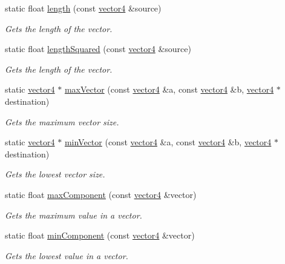 \begin{DoxyCompactItemize}
static float \hyperlink{classflounder_1_1vector4_a0e726e01876f3383d857fa6c4e45c293}{length} (const \hyperlink{classflounder_1_1vector4}{vector4} \&source)
\begin{DoxyCompactList}\small\item\em Gets the length of the vector. \end{DoxyCompactList}\item 
static float \hyperlink{classflounder_1_1vector4_a39b1fe0dc549e692807b92b757c5fb95}{length\+Squared} (const \hyperlink{classflounder_1_1vector4}{vector4} \&source)
\begin{DoxyCompactList}\small\item\em Gets the length of the vector. \end{DoxyCompactList}\item 
static \hyperlink{classflounder_1_1vector4}{vector4} $\ast$ \hyperlink{classflounder_1_1vector4_ab54994d53838a60f6cfa2519b931974e}{max\+Vector} (const \hyperlink{classflounder_1_1vector4}{vector4} \&a, const \hyperlink{classflounder_1_1vector4}{vector4} \&b, \hyperlink{classflounder_1_1vector4}{vector4} $\ast$destination)
\begin{DoxyCompactList}\small\item\em Gets the maximum vector size. \end{DoxyCompactList}\item 
static \hyperlink{classflounder_1_1vector4}{vector4} $\ast$ \hyperlink{classflounder_1_1vector4_afa41f2596ff30b2a840ee4c7ab7d571c}{min\+Vector} (const \hyperlink{classflounder_1_1vector4}{vector4} \&a, const \hyperlink{classflounder_1_1vector4}{vector4} \&b, \hyperlink{classflounder_1_1vector4}{vector4} $\ast$destination)
\begin{DoxyCompactList}\small\item\em Gets the lowest vector size. \end{DoxyCompactList}\item 
static float \hyperlink{classflounder_1_1vector4_ae9825f135cc1cefd981779b7df9bf1f6}{max\+Component} (const \hyperlink{classflounder_1_1vector4}{vector4} \&vector)
\begin{DoxyCompactList}\small\item\em Gets the maximum value in a vector. \end{DoxyCompactList}\item 
static float \hyperlink{classflounder_1_1vector4_af80703e6424fc955beb942b9af78e934}{min\+Component} (const \hyperlink{classflounder_1_1vector4}{vector4} \&vector)
\begin{DoxyCompactList}\small\item\em Gets the lowest value in a vector. \end{DoxyCompactList}\item 

\end{DoxyCompactItemize}
